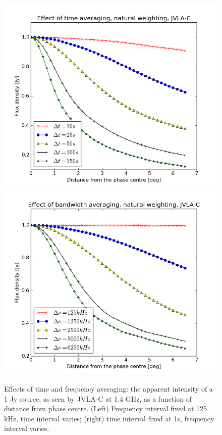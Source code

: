 \documentclass[useAMS,usenatbib]{mn2e}
\begin{document}
\begin{figure}
\includegraphics[width=\columnwidth]{./Figures/effect_time_averaging.png}%
\includegraphics[width=\columnwidth]{./Figures/effect_bandwidth_averaging.png}
\caption{Effects of time and frequency averaging: the apparent intensity of a 1 Jy source, as seen by JVLA-C at 1.4 GHz, 
as a function of distance from phase centre. (Left) Frequency interval fixed at 125 kHz, time interval varies; 
(right) time interval fixed at 1s, frequency interval varies.}\label{fig:smear}
\end{figure}
\end{document}
